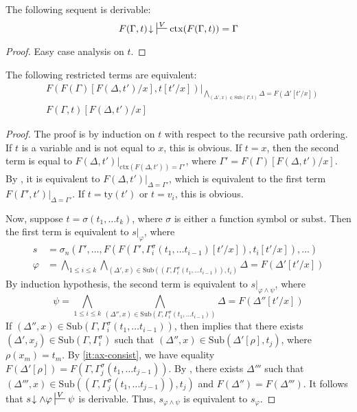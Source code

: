 \documentclass[reqno]{amsart}
\theoremstyle{definition}
\theoremstyle{remark}
\newcommand{\fs}[1]{\mathrm{#1}}
\newcommand{\subst}{\fs{subst}}
\newcommand{\ty}{\fs{ty}}
\newcommand{\ctx}{\fs{ctx}}
\newcommand{\sub}{\fs{Sub}}
\numberwithin{figure}{section}
\begin{document}
\begin{lem}
The following sequent is derivable:
\[ F(\Gamma,t)\!\downarrow\ \sststile{}{V} \ctx(F(\Gamma,t)) = \Gamma \]
\end{lem}
\begin{proof}
Easy case analysis on $t$.
\end{proof}

\begin{lem}
The following restricted terms are equivalent:
\begin{align*}
& F(F(\Gamma)[F(\Delta,t')/x], t[t'/x])|_{\bigwedge_{(\Delta',x) \in \sub(\Gamma,t)} \Delta = F(\Delta'[t'/x])} \\
& F(\Gamma,t)[F(\Delta,t')/x]
\end{align*}
\end{lem}
\begin{proof}
The proof is by induction on $t$ with respect to the recursive path ordering.
If $t$ is a variable and is not equal to $x$, this is obvious.
If $t = x$, then the second term is equal to $F(\Delta,t')|_{\ctx(F(\Delta,t')) = \Gamma'}$, where $\Gamma' = F(\Gamma)[F(\Delta,t')/x]$.
By , it is equivalent to $F(\Delta,t')|_{\Delta = \Gamma'}$, which is equivalent to the first term $F(\Gamma',t')|_{\Delta = \Gamma'}$.
If $t = \ty(t')$ or $t = v_i$, this is obvious.

Now, suppose $t = \sigma(t_1, \ldots t_k)$, where $\sigma$ is either a function symbol or $\subst$.
Then the first term is equivalent to $s|_\varphi$, where
\begin{align*}
s & = \sigma_n(\Gamma', \ldots, F(F(\Gamma', \Gamma^\sigma_i(t_1, \ldots t_{i-1})[t'/x]), t_i[t'/x]), \ldots) \\
\varphi & = \bigwedge_{1 \leq i \leq k} \bigwedge_{(\Delta',x) \in \sub((\Gamma,\Gamma^\sigma_i(t_1, \ldots t_{i-1})),t_i)} \Delta = F(\Delta'[t'/x])
\end{align*}
By induction hypothesis, the second term is equivalent to $s|_{\varphi \land \psi}$, where
\[ \psi = \bigwedge_{1 \leq i \leq k} \bigwedge_{(\Delta'',x) \in \sub(\Gamma,\Gamma^\sigma_i(t_1, \ldots t_{i-1}))} \Delta = F(\Delta''[t'/x]) \]
If $(\Delta'',x) \in \sub(\Gamma,\Gamma^\sigma_i(t_1, \ldots t_{i-1}))$, then  implies that there exists $(\Delta',x_j) \in \sub(\Gamma,\Gamma^\sigma_i)$ such that $(\Delta'',x) \in \sub(\Delta'[\rho], t_j)$, where $\rho(x_m) = t_m$.
By \eqref{it:ax-consist}, we have equality $F(\Delta'[\rho]) = F(\Gamma,\Gamma^\sigma_j(t_1, \ldots t_{j-1}))$.
By , there exists $\Delta'''$ such that $(\Delta''',x) \in \sub((\Gamma,\Gamma^\sigma_j(t_1, \ldots t_{j-1})), t_j)$ and $F(\Delta'') = F(\Delta''')$.
It follows that $s\!\downarrow \land \varphi \sststile{}{V} \psi$ is derivable.
Thus, $s_{\varphi \land \psi}$ is equivalent to $s_\varphi$.
\end{proof}
\end{document}
